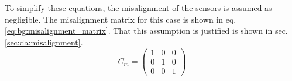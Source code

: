 To simplify these equations, the misalignment of the sensors is assumed as negligible. The misalignment matrix for this case is shown in eq. \eqref{eq:bg:misalignment_matrix}. That this assumption is justified is shown in sec. \ref{sec:da:misalignment}.
\begin{equation}
    C_m= \begin{pmatrix} 1 & 0 & 0 \\
                         0 & 1 & 0 \\
                         0 & 0 & 1 \end{pmatrix}
                         \label{eq:bg:misalignment_matrix}
\end{equation}